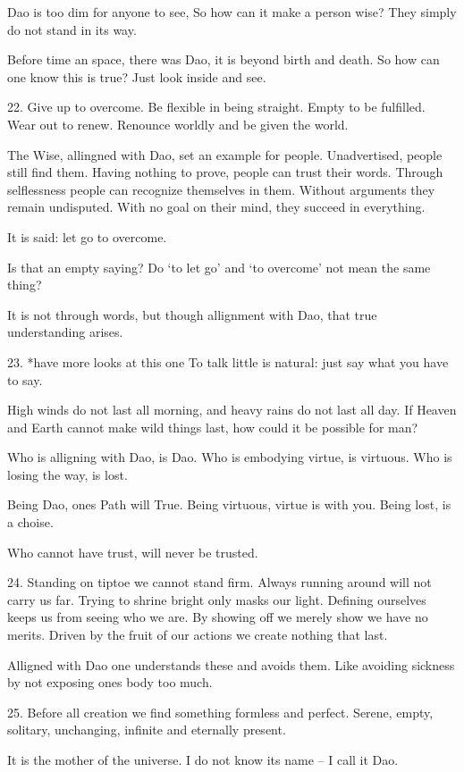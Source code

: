 \documentclass[10pt,a4paper]{book}
\begin{document}
Dao is too dim for anyone to see,
So how can it make a person wise?
They simply do not stand in its way.

Before time an space, there was Dao,
it is beyond birth and death.
So how can one know this is true?
Just look inside and see.


22.
Give up to overcome.
Be flexible in being straight.
Empty to be fulfilled.
Wear out to renew.
Renounce worldly and be given the world.

The Wise, allingned with Dao, set an example for people.
Unadvertised, people still find them.
Having nothing to prove, people can trust their words.
Through selflessness people can recognize themselves in them.
Without arguments they remain undisputed.
With no goal on their mind, they succeed in everything.

It is said: let go to overcome.

Is that an empty saying?
Do `to let go' and `to overcome' not mean the same thing?

It is not through words, but though allignment with Dao,
that true understanding arises.


23. *have more looks at this one
To talk little is natural: just say what you have to say.

High winds do not last all morning,
and heavy rains do not last all day.
If Heaven and Earth cannot make wild things last,
how could it be possible for man?

Who is alligning with Dao, is Dao.
Who is embodying virtue, is virtuous.
Who is losing the way, is lost.

Being Dao, ones Path will True.
Being virtuous, virtue is with you.
Being lost, is a choise.

Who cannot have trust, will never be trusted.


24.
Standing on tiptoe we cannot stand firm.
Always running around will not carry us far.
Trying to shrine bright only masks our light.
Defining ourselves keeps us from seeing who we are.
By showing off we merely show we have no merits.
Driven by the fruit of our actions we create nothing that last.

Alligned with Dao one understands these and avoids them.
Like avoiding sickness by not exposing ones body too much.


25.
Before all creation we find something formless and perfect.
Serene, empty, solitary, unchanging, inﬁnite and eternally present.

It is the mother of the universe.
I do not know its name -- I call it Dao.
\end{document}
